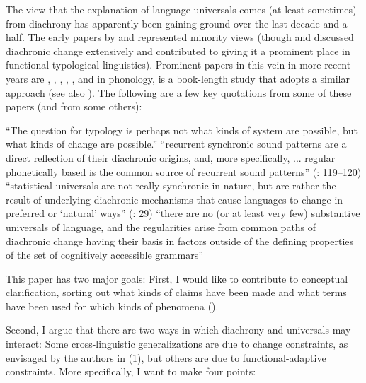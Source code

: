\documentclass[output=paper]{langsci/langscibook}
\begin{document}
The view that the explanation of language universals comes (at least sometimes) from diachrony has apparently been gaining ground over the last decade and a half. The early papers by \citet{Greenberg1969, Greenberg1978_Diachr} and \citet{Bybee1988} represented minority views (though \citealt{Givón1979} and \citealt{Lehmann1982} discussed diachronic change extensively and contributed to giving it a prominent place in functional-typological linguistics). Prominent papers in this vein in more recent years are \citet{Aristar1991}, \citet{Anderson2005, Anderson2008, Anderson2016}, \citet{Cristofaro2012, Cristofaro2013, Cristofaro2014}, \citet{Creissels2008}, \citet{GildeaZúñiga2016}, and in phonology, \citet{Blevins2004} is a book-length study that adopts a similar approach (see also \citealt{Blevins2006}). The following are a few key quotations from some of these papers (and from some others):

\eanoraggedright
  \ea “The question for typology is perhaps not what kinds of system are possible, but what kinds of change are possible.” \citep[195]{Timberlake2003}
  \newpage 
  \ex “recurrent synchronic sound patterns are a direct reflection of their diachronic origins, and, more specifically, ... regular phonetically based  is the common source of recurrent sound patterns” (\citealt{Blevins2006}: 119–120)
  \ex “statistical universals are not really synchronic in nature, but are rather the result of underlying diachronic mechanisms that cause languages to change in preferred or ‘natural’ ways” (\citealt{BickelEtAl2015}: 29)
  \ex “there are no (or at least very few) substantive universals of language, and the regularities arise from common paths of diachronic change having their basis in factors outside of the defining properties of the set of cognitively accessible grammars” \citep[11]{Anderson2016}
  \z
\z

This paper has two major goals: First, I would like to contribute to conceptual clarification, sorting out what kinds of claims have been made and what terms have been used for which kinds of phenomena ().

Second, I argue that there are two ways in which diachrony and universals may interact: Some cross-linguistic generalizations are due to change constraints, as envisaged by the authors in (1), but others are due to functional-adaptive constraints. More specifically, I want to make four points:
\end{document}
